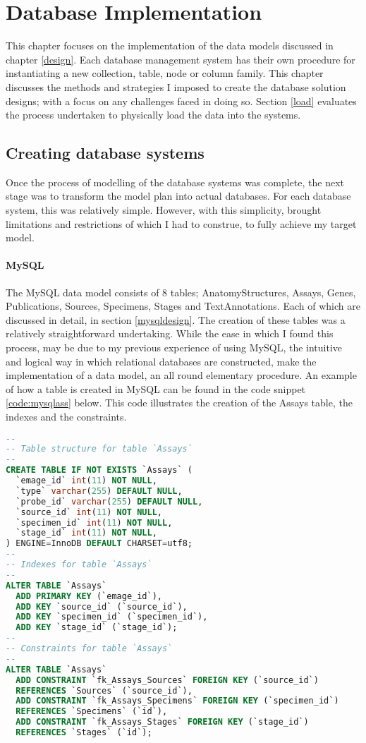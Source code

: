 \chapter{Database Implementation}\label{implementation}
This chapter focuses on the implementation of the data models discussed in chapter \ref{design}. Each database management system has their own procedure for instantiating a new collection, table, node or column family. This chapter discusses the methods and strategies I imposed to create the database solution designs; with a focus on any challenges faced in doing so. Section \ref{load} evaluates the process undertaken to physically load the data into the systems.

\section{Creating database systems}\label{dbcreate}
Once the process of modelling of the database systems was complete, the next stage was to transform the model plan into actual databases. For each database system, this was relatively simple. However, with this simplicity, brought limitations and restrictions of which I had to construe, to fully achieve my target model.

\subsubsection*{MySQL}
The MySQL data model consists of 8 tables; AnatomyStructures, Assays, Genes, Publications, Sources, Specimens, Stages and TextAnnotations. Each of which are discussed in detail, in section \ref{mysqldesign}. The creation of these tables was a relatively straightforward undertaking. While the ease in which I found this process, may be due to my previous experience of using MySQL, the intuitive and logical way in which relational databases are constructed, make the implementation of a data model, an all round elementary procedure. An example of how a table is created in MySQL can be found in the code snippet \ref{code:mysqlass} below. This code illustrates the creation of the Assays table, the indexes and the constraints.
\newpage
\begin{lstlisting}[language=SQL, caption=Creation of Assays table, label=code:mysqlass]
--
-- Table structure for table `Assays`
--
CREATE TABLE IF NOT EXISTS `Assays` (
  `emage_id` int(11) NOT NULL,
  `type` varchar(255) DEFAULT NULL,
  `probe_id` varchar(255) DEFAULT NULL,
  `source_id` int(11) NOT NULL,
  `specimen_id` int(11) NOT NULL,
  `stage_id` int(11) NOT NULL,
) ENGINE=InnoDB DEFAULT CHARSET=utf8;
--
-- Indexes for table `Assays`
--
ALTER TABLE `Assays`
  ADD PRIMARY KEY (`emage_id`),
  ADD KEY `source_id` (`source_id`),
  ADD KEY `specimen_id` (`specimen_id`),
  ADD KEY `stage_id` (`stage_id`);
--
-- Constraints for table `Assays`
--
ALTER TABLE `Assays`
  ADD CONSTRAINT `fk_Assays_Sources` FOREIGN KEY (`source_id`)
  REFERENCES `Sources` (`source_id`),
  ADD CONSTRAINT `fk_Assays_Specimens` FOREIGN KEY (`specimen_id`)
  REFERENCES `Specimens` (`id`),
  ADD CONSTRAINT `fk_Assays_Stages` FOREIGN KEY (`stage_id`)
  REFERENCES `Stages` (`id`);
\end{lstlisting}

